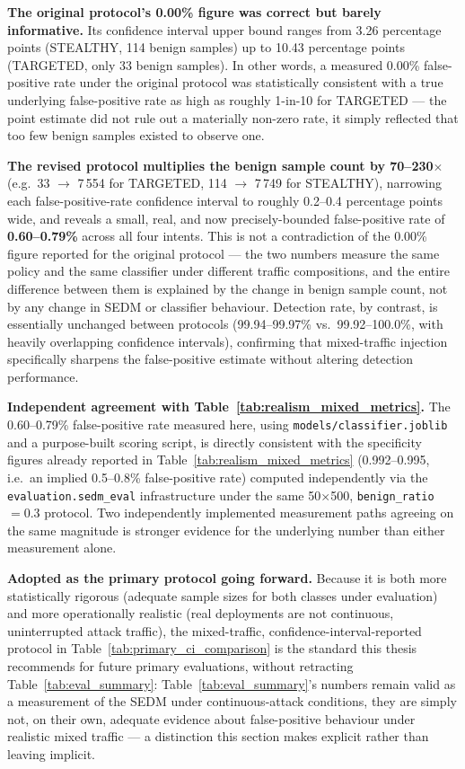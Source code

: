 \textbf{The original protocol's 0.00\% figure was correct but barely
informative.} Its confidence interval upper bound ranges from 3.26
percentage points (STEALTHY, 114 benign samples) up to 10.43 percentage
points (TARGETED, only 33 benign samples). In other words, a measured
0.00\% false-positive rate under the original protocol was statistically
consistent with a true underlying false-positive rate as high as roughly
1-in-10 for TARGETED — the point estimate did not rule out a materially
non-zero rate, it simply reflected that too few benign samples existed to
observe one.

\textbf{The revised protocol multiplies the benign sample count by
70--230$\times$} (e.g.\ 33 $\to$ 7\,554 for TARGETED, 114 $\to$ 7\,749 for
STEALTHY), narrowing each false-positive-rate confidence interval to
roughly 0.2--0.4 percentage points wide, and reveals a small, real, and now
precisely-bounded false-positive rate of \textbf{0.60--0.79\%} across all
four intents. This is not a contradiction of the 0.00\% figure reported for
the original protocol — the two numbers measure the same policy and the
same classifier under different traffic compositions, and the entire
difference between them is explained by the change in benign sample count,
not by any change in SEDM or classifier behaviour. Detection rate, by
contrast, is essentially unchanged between protocols (99.94--99.97\%
vs.\ 99.92--100.0\%, with heavily overlapping confidence intervals),
confirming that mixed-traffic injection specifically sharpens the
false-positive estimate without altering detection performance.

\textbf{Independent agreement with Table~\ref{tab:realism_mixed_metrics}.}
The 0.60--0.79\% false-positive rate measured here, using
\texttt{models/classifier.joblib} and a purpose-built scoring script, is
directly consistent with the specificity figures already reported in
Table~\ref{tab:realism_mixed_metrics} (0.992--0.995, i.e.\ an implied
0.5--0.8\% false-positive rate) computed independently via the
\texttt{evaluation.sedm\_eval} infrastructure under the same
50$\times$500, \texttt{benign\_ratio}$=0.3$ protocol. Two independently
implemented measurement paths agreeing on the same magnitude is stronger
evidence for the underlying number than either measurement alone.

\textbf{Adopted as the primary protocol going forward.} Because it is both
more statistically rigorous (adequate sample sizes for both classes under
evaluation) and more operationally realistic (real deployments are not
continuous, uninterrupted attack traffic), the mixed-traffic,
confidence-interval-reported protocol in Table~\ref{tab:primary_ci_comparison}
is the standard this thesis recommends for future primary evaluations,
without retracting Table~\ref{tab:eval_summary}: Table~\ref{tab:eval_summary}'s
numbers remain valid as a measurement of the SEDM under continuous-attack
conditions, they are simply not, on their own, adequate evidence about
false-positive behaviour under realistic mixed traffic — a distinction this
section makes explicit rather than leaving implicit.

